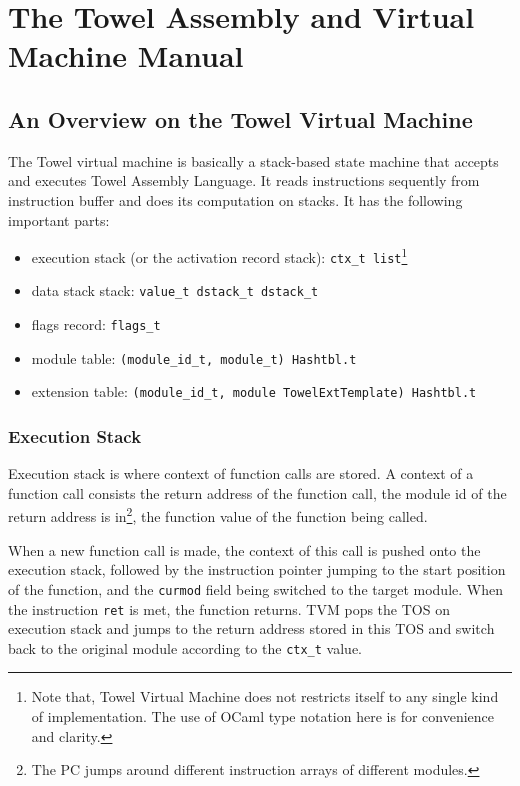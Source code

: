\documentclass{report}
\begin{document}
\part{The Towel Assembly and Virtual Machine Manual}

\chapter{An Overview on the Towel Virtual Machine}

The Towel virtual machine is basically a stack-based state machine that accepts and executes Towel Assembly Language. It reads instructions sequently from instruction buffer and does its computation on stacks. It has the following important parts:
\begin{itemize}
\item execution stack (or the activation record stack): \texttt{ctx\_t list}\footnote{Note that, Towel Virtual Machine does not restricts itself to any single kind of implementation. The use of OCaml type notation here is for convenience and clarity.}
\item data stack stack: \texttt{value\_t dstack\_t dstack\_t}
\item flags record: \texttt{flags\_t}
\item module table: \texttt{(module\_id\_t, module\_t) Hashtbl.t}
\item extension table: \texttt{(module\_id\_t, module TowelExtTemplate) Hashtbl.t}
\end{itemize}

\section{Execution Stack}

Execution stack is where context of function calls are stored. A context of a function call consists the return address of the function call, the module id of the return address is in\footnote{The PC jumps around different instruction arrays of different modules.}, the function value of the function being called.

When a new function call is made, the context of this call is pushed onto the execution stack, followed by the instruction pointer jumping to the start position of the function, and the \texttt{curmod} field being switched to the target module. When the instruction \texttt{ret} is met, the function returns. TVM pops the TOS on execution stack and jumps to the return address stored in this TOS and switch back to the original module according to the \texttt{ctx\_t} value.
\end{document}
